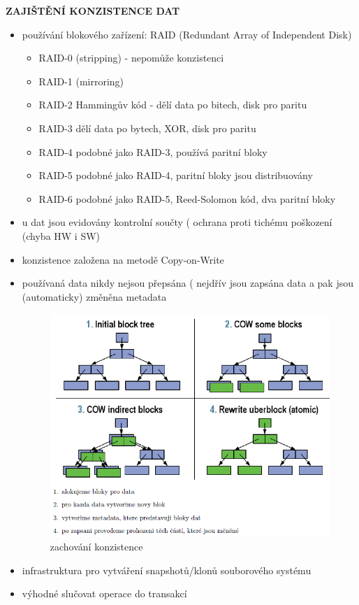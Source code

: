 \documentclass[10pt,a4paper]{article}
\begin{document}
\textbf{ZAJIŠTĚNÍ KONZISTENCE DAT}
\begin{itemize}
	\item používání blokového zařízení: RAID (Redundant Array of Independent Disk)
	\begin{itemize}
		\item RAID-0 (stripping) - nepomůže konzistenci
		\item RAID-1 (mirroring)
		\item RAID-2 Hammingův kód - dělí data po bitech, disk pro paritu
		\item RAID-3 dělí data po bytech, XOR, disk pro paritu
		\item RAID-4 podobné jako RAID-3, používá paritní bloky
		\item RAID-5 podobné jako RAID-4, paritní bloky jsou distribuovány
		\item RAID-6 podobné jako RAID-5, Reed-Solomon kód, dva paritní bloky
	\end{itemize}
	\item u dat jsou evidovány kontrolní součty ( ochrana proti tichému poškození (chyba HW i SW)
	\item konzistence založena na metodě Copy-on-Write
	\item používaná data nikdy nejsou přepsána ( nejdřív jsou zapsána data a pak jsou (automaticky)
změněna metadata
	\begin{figure} [h]
		\includegraphics[scale=0.8]{img/konzistence.png}
		\caption{zachování konzistence}
	\end{figure}
	\item infrastruktura pro vytváření snapshotů/klonů souborového systému
	\item výhodné slučovat operace do transakcí
\end{itemize}
\end{document}
